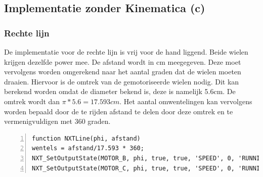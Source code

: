 \documentclass[a4paper]{article}
\begin{document}
\subsection{Implementatie zonder Kinematica (c)}
\subsubsection{Rechte lijn}
De implementatie voor de rechte lijn is vrij voor de hand liggend. Beide wielen krijgen dezelfde power mee. De afstand wordt in cm meegegeven. Deze moet vervolgens worden omgerekend naar het aantal graden dat de wielen moeten draaien. Hiervoor is de omtrek van de gemotoriseerde wielen nodig. Dit kan berekend worden omdat de diameter bekend is, deze is namelijk 5.6cm. De omtrek wordt dan $\pi * 5.6 = 17.593cm$. Het aantal omwentelingen kan vervolgens worden bepaald door de te rijden afstand te delen door deze omtrek en te vermenigvuldigen met 360 graden.
\begin{lstlisting}[caption=Rechte lijn, label=lst:line, numbers=left]
function NXTLine(phi, afstand)
wentels = afstand/17.593 * 360;
NXT_SetOutputState(MOTOR_B, phi, true, true, 'SPEED', 0, 'RUNNING', wentels, 'dontreply');
NXT_SetOutputState(MOTOR_C, phi, true, true, 'SPEED', 0, 'RUNNING', wentels, 'dontreply');
\end{lstlisting}
\end{document}
